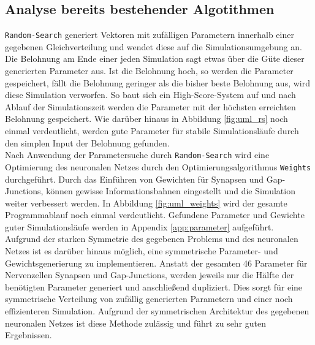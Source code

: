	\subsection{Analyse bereits bestehender Algotithmen}
		\texttt{Random-Search} generiert Vektoren mit zufälligen Parametern innerhalb einer gegebenen Gleichverteilung und wendet diese auf die Simulationsumgebung an. Die Belohnung am Ende einer jeden Simulation sagt etwas über die Güte dieser generierten Parameter aus. Ist die Belohnung hoch, so werden die Parameter gespeichert, fällt die Belohnung geringer als die bisher beste Belohnung aus, wird diese Simulation verworfen. So baut sich ein High-Score-System auf und nach Ablauf der Simulationszeit werden die Parameter mit der höchsten erreichten Belohnung gespeichert.	Wie darüber hinaus in Abbildung \ref{fig:uml_rs} noch einmal verdeutlicht, werden gute Parameter für stabile Simulationsläufe durch den simplen Input der Belohnung gefunden.\\
		Nach Anwendung der Parametersuche durch \texttt{Random-Search} wird eine Optimierung des neuronalen Netzes durch den Optimierungsalgorithmus \texttt{Weights} durchgeführt. Durch das Einführen von Gewichten für Synapsen und Gap-Junctions, können gewisse Informationsbahnen eingestellt und die Simulation weiter verbessert werden. In Abbildung \ref{fig:uml_weights} wird der gesamte Programmablauf noch einmal verdeutlicht.	Gefundene Parameter und Gewichte guter Simulationsläufe werden in Appendix \ref{app:parameter} aufgeführt.\\
		Aufgrund der starken Symmetrie des gegebenen Problems und des neuronalen Netzes ist es darüber hinaus möglich, eine symmetrische Parameter- und Gewichtsgenerierung zu implementieren. Anstatt der gesamten 46 Parameter für Nervenzellen Synapsen und Gap-Junctions, werden jeweils nur die Hälfte der benötigten Parameter generiert und anschließend dupliziert. Dies sorgt für eine symmetrische Verteilung von zufällig generierten Parametern und einer noch effizienteren Simulation. Aufgrund der symmetrischen Architektur des gegebenen neuronalen Netzes ist diese Methode zulässig und führt zu sehr guten Ergebnissen.
